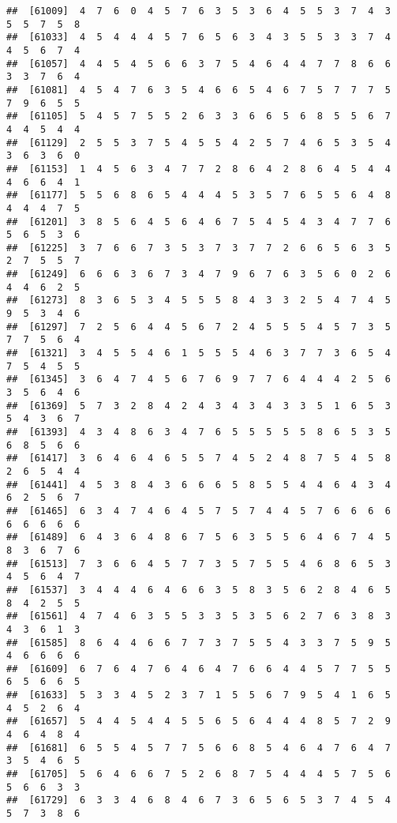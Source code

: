 \documentclass[
]{book}
\begin{document}
\begin{verbatim}
##  [61009]  4  7  6  0  4  5  7  6  3  5  3  6  4  5  5  3  7  4  3  5  5  7  5  8
##  [61033]  4  5  4  4  4  5  7  6  5  6  3  4  3  5  5  3  3  7  4  4  5  6  7  4
##  [61057]  4  4  5  4  5  6  6  3  7  5  4  6  4  4  7  7  8  6  6  3  3  7  6  4
##  [61081]  4  5  4  7  6  3  5  4  6  6  5  4  6  7  5  7  7  7  5  7  9  6  5  5
##  [61105]  5  4  5  7  5  5  2  6  3  3  6  6  5  6  8  5  5  6  7  4  4  5  4  4
##  [61129]  2  5  5  3  7  5  4  5  5  4  2  5  7  4  6  5  3  5  4  3  6  3  6  0
##  [61153]  1  4  5  6  3  4  7  7  2  8  6  4  2  8  6  4  5  4  4  4  6  6  4  1
##  [61177]  5  5  6  8  6  5  4  4  4  5  3  5  7  6  5  5  6  4  8  4  4  4  7  5
##  [61201]  3  8  5  6  4  5  6  4  6  7  5  4  5  4  3  4  7  7  6  5  6  5  3  6
##  [61225]  3  7  6  6  7  3  5  3  7  3  7  7  2  6  6  5  6  3  5  2  7  5  5  7
##  [61249]  6  6  6  3  6  7  3  4  7  9  6  7  6  3  5  6  0  2  6  4  4  6  2  5
##  [61273]  8  3  6  5  3  4  5  5  5  8  4  3  3  2  5  4  7  4  5  9  5  3  4  6
##  [61297]  7  2  5  6  4  4  5  6  7  2  4  5  5  5  4  5  7  3  5  7  7  5  6  4
##  [61321]  3  4  5  5  4  6  1  5  5  5  4  6  3  7  7  3  6  5  4  7  5  4  5  5
##  [61345]  3  6  4  7  4  5  6  7  6  9  7  7  6  4  4  4  2  5  6  3  5  6  4  6
##  [61369]  5  7  3  2  8  4  2  4  3  4  3  4  3  3  5  1  6  5  3  5  4  3  6  7
##  [61393]  4  3  4  8  6  3  4  7  6  5  5  5  5  5  8  6  5  3  5  6  8  5  6  6
##  [61417]  3  6  4  6  4  6  5  5  7  4  5  2  4  8  7  5  4  5  8  2  6  5  4  4
##  [61441]  4  5  3  8  4  3  6  6  6  5  8  5  5  4  4  6  4  3  4  6  2  5  6  7
##  [61465]  6  3  4  7  4  6  4  5  7  5  7  4  4  5  7  6  6  6  6  6  6  6  6  6
##  [61489]  6  4  3  6  4  8  6  7  5  6  3  5  5  6  4  6  7  4  5  8  3  6  7  6
##  [61513]  7  3  6  6  4  5  7  7  3  5  7  5  5  4  6  8  6  5  3  4  5  6  4  7
##  [61537]  3  4  4  4  6  4  6  6  3  5  8  3  5  6  2  8  4  6  5  8  4  2  5  5
##  [61561]  4  7  4  6  3  5  5  3  3  5  3  5  6  2  7  6  3  8  3  4  3  6  1  3
##  [61585]  8  6  4  4  6  6  7  7  3  7  5  5  4  3  3  7  5  9  5  4  6  6  6  6
##  [61609]  6  7  6  4  7  6  4  6  4  7  6  6  4  4  5  7  7  5  5  6  5  6  6  5
##  [61633]  5  3  3  4  5  2  3  7  1  5  5  6  7  9  5  4  1  6  5  4  5  2  6  4
##  [61657]  5  4  4  5  4  4  5  5  6  5  6  4  4  4  8  5  7  2  9  4  6  4  8  4
##  [61681]  6  5  5  4  5  7  7  5  6  6  8  5  4  6  4  7  6  4  7  3  5  4  6  5
##  [61705]  5  6  4  6  6  7  5  2  6  8  7  5  4  4  4  5  7  5  6  5  6  6  3  3
##  [61729]  6  3  3  4  6  8  4  6  7  3  6  5  6  5  3  7  4  5  4  5  7  3  8  6

\end{verbatim}
\end{document}
